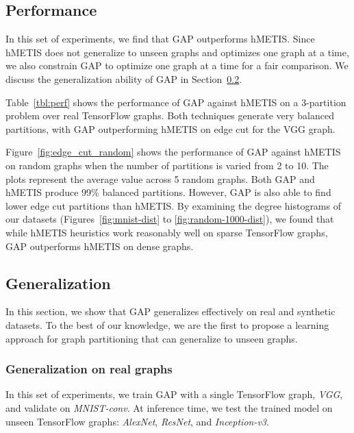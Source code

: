 \documentclass[10pt,twocolumn]{article}
\begin{document}
\subsection{Performance}
\label{sec:perf}
In this set of experiments, we find that GAP outperforms hMETIS. Since hMETIS does not generalize to unseen graphs and optimizes one graph at a time, we also constrain GAP to optimize one graph at a time for a fair comparison. We discuss the generalization ability of GAP in Section~\ref{sec:gen}. 

Table~\ref{tbl:perf} shows the performance of GAP against hMETIS on a 3-partition problem over real TensorFlow graphs. Both techniques generate very balanced partitions, with GAP outperforming hMETIS on edge cut for the VGG graph.


Figure~\ref{fig:edge_cut_random} shows the performance of GAP against hMETIS on random graphs when the number of partitions is varied from 2 to 10. The plots represent the average value across 5 random graphs. Both GAP and hMETIS produce 99\% balanced partitions. However, GAP is also able to find lower edge cut partitions than hMETIS. By examining the degree histograms of our datasets (Figures~\ref{fig:mnist-dist} to \ref{fig:random-1000-dist}), we found that while hMETIS heuristics work reasonably well on sparse TensorFlow graphs, GAP outperforms hMETIS on dense graphs.

\subsection{Generalization}
\label{sec:gen}
In this section, we show that GAP generalizes effectively on real and synthetic datasets. To the best of our knowledge, we are the first to propose a learning approach for graph partitioning that can generalize to unseen graphs.

\subsubsection{Generalization on real graphs}
In this set of experiments, we train GAP with a single TensorFlow graph, \textit{VGG}, and validate on \textit{MNIST-conv}. At inference time, we test the trained model on unseen TensorFlow graphs: \textit{AlexNet}, \textit{ResNet}, and \textit{Inception-v3}. 
\end{document}
